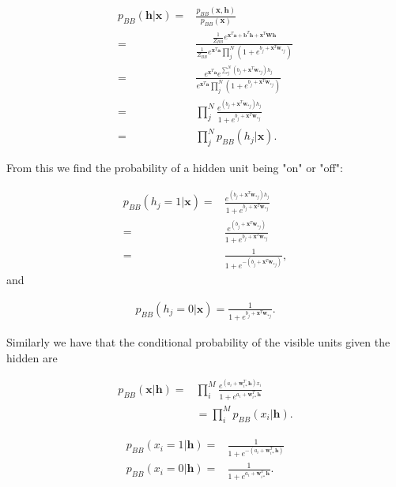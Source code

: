 \documentclass[%
oneside,                 %
final,                   %
10pt]{article}
\begin{document}
\begin{align}
	p_{BB} (\bm{h}|\bm{x}) =& \frac{p_{BB} (\bm{x}, \bm{h})}{p_{BB} (\bm{x})} \nonumber \\
	=& \frac{ \frac{1}{Z_{BB}}  e^{\bm{x}^T \bm{a} + \bm{b}^T \bm{h} + \bm{x}^T \bm{W} \bm{h}} }
	        {\frac{1}{Z_{BB}} e^{\bm{x}^T \bm{a}} \prod_j^N (1 + e^{b_j + \bm{x}^T \bm{w}_{\ast j}})} \nonumber \\
	=& \frac{  e^{\bm{x}^T \bm{a}} e^{ \sum_j^N (b_j + \bm{x}^T \bm{w}_{\ast j} ) h_j} }
	        { e^{\bm{x}^T \bm{a}} \prod_j^N (1 + e^{b_j + \bm{x}^T \bm{w}_{\ast j}})} \nonumber \\
	=& \prod_j^N \frac{ e^{(b_j + \bm{x}^T \bm{w}_{\ast j} ) h_j}  }
	{1 + e^{b_j + \bm{x}^T \bm{w}_{\ast j}}} \nonumber \\
	=& \prod_j^N p_{BB} (h_j| \bm{x}) .
\end{align}

From this we find the probability of a hidden unit being "on" or "off":

\begin{align}
	p_{BB} (h_j=1 | \bm{x}) =&   \frac{ e^{(b_j + \bm{x}^T \bm{w}_{\ast j} ) h_j}  }
	{1 + e^{b_j + \bm{x}^T \bm{w}_{\ast j}}} \\
	=&  \frac{ e^{(b_j + \bm{x}^T \bm{w}_{\ast j} )}  }
	{1 + e^{b_j + \bm{x}^T \bm{w}_{\ast j}}} \\
	=&  \frac{ 1 }{1 + e^{-(b_j + \bm{x}^T \bm{w}_{\ast j})} } ,
\end{align}
and

\begin{align}
	p_{BB} (h_j=0 | \bm{x}) =\frac{ 1 }{1 + e^{b_j + \bm{x}^T \bm{w}_{\ast j}} } .
\end{align}

Similarly we have that the conditional probability of the visible units given the hidden are

\begin{align}
	p_{BB} (\bm{x}|\bm{h}) =& \prod_i^M \frac{ e^{ (a_i + \bm{w}_{i\ast}^T \bm{h}) x_i} }{ 1 + e^{a_i + \bm{w}_{i\ast}^T \bm{h}} } \\
	&= \prod_i^M p_{BB} (x_i | \bm{h}) .
\end{align}

\begin{align}
	p_{BB} (x_i=1 | \bm{h}) =& \frac{1}{1 + e^{-(a_i + \bm{w}_{i\ast}^T \bm{h} )}} \\
	p_{BB} (x_i=0 | \bm{h}) =& \frac{1}{1 + e^{a_i + \bm{w}_{i\ast}^T \bm{h} }} .
\end{align}
\end{document}
